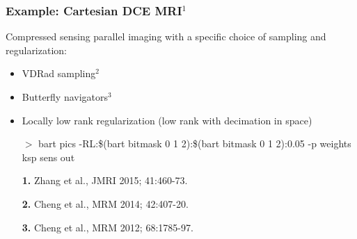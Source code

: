 \documentclass{beamer}
\begin{document}
\begin{frame}
\frametitle{Example: Cartesian DCE MRI$^1$}

Compressed sensing parallel imaging with a
specific choice of sampling and regularization:
\vspace{0.3cm}
\begin{itemize}
\item {VDRad sampling$^2$}
\item {\color{red}Butterfly navigators$^3$}
\vspace{0.3cm}
\item {\color{yellow}Locally low rank regularization} (low rank with decimation in {\color{blue}space})
\item[$>$] bart pics -R{\color{yellow}L}:{\color{blue}\$(bart bitmask 0 1 2)}:{\color{blue}\$(bart bitmask 0 1
  2)}:{\color{pink}0.05}  {\color{red}-p weights} ksp {\color{green}sens} out
\end{itemize}



\vfill
{\tiny
\begin{itemize}
\item[] {\bf 1.} Zhang et al., JMRI 2015; 41:460-73.
\item[] {\bf 2.} Cheng et al., MRM 2014; 42:407-20.
\item[] {\bf 3.} Cheng et al., MRM 2012; 68:1785-97.
\end{itemize}
}

\end{frame}
\end{document}
